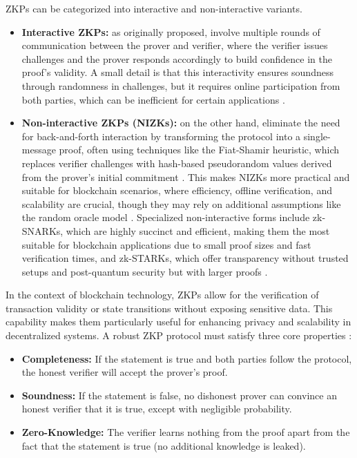 ZKPs can be categorized into interactive and non-interactive variants. 
\vspace{12pt}

\begin{itemize}
  \item \textbf{Interactive ZKPs:} as originally proposed, involve multiple rounds of communication between the prover and verifier, where the verifier issues challenges and the prover responds accordingly to build confidence in the proof's validity. A small detail is that this interactivity ensures soundness through randomness in challenges, but it requires online participation from both parties, which can be inefficient for certain applications \cite{GMR89}.

  \vspace{12pt}

  \item \textbf{Non-interactive ZKPs (NIZKs):} on the other hand, eliminate the need for back-and-forth interaction by transforming the protocol into a single-message proof, often using techniques like the Fiat-Shamir heuristic, which replaces verifier challenges with hash-based pseudorandom values derived from the prover's initial commitment \cite{FS86}. This makes NIZKs more practical and suitable for blockchain scenarios, where efficiency, offline verification, and scalability are crucial, though they may rely on additional assumptions like the random oracle model \cite{FS86}. Specialized non-interactive forms include zk-SNARKs, which are highly succinct and efficient, making them the most suitable for blockchain applications due to small proof sizes and fast verification times, and zk-STARKs, which offer transparency without trusted setups and post-quantum security but with larger proofs \cite{Gro16,Tra23,Gog25,Hab25}.
\end{itemize}

\vspace{12pt}

In the context of blockchain technology, ZKPs allow for the verification of transaction validity or state transitions without exposing sensitive data. This capability makes them particularly useful for enhancing privacy and scalability in decentralized systems. A robust ZKP protocol must satisfy three core properties \cite{Lav23}:

\vspace{12pt}

\begin{itemize}
    \item \textbf{Completeness:} If the statement is true and both parties follow the protocol, the honest verifier will accept the prover’s proof.
    \item \textbf{Soundness:} If the statement is false, no dishonest prover can convince an honest verifier that it is true, except with negligible probability.
    \item \textbf{Zero-Knowledge:} The verifier learns nothing from the proof apart from the fact that the statement is true (no additional knowledge is leaked).
\end{itemize}

